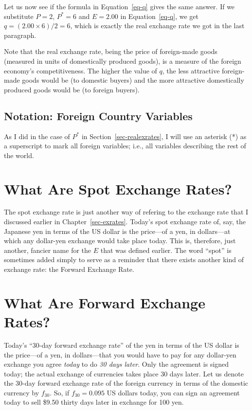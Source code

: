\documentclass[
  letterpaper,
]{book}
\theoremstyle{plain}
\theoremstyle{remark}
\begin{document}
Let us now see if the formula in Equation~\ref{eq-q} gives the same
answer. If we substitute \(P=2\), \(P^*=6\) and \(E=2.00\) in
Equation~\ref{eq-q}, we get \(q=(2.00\times 6)/2 =6\), which is exactly
the real exchange rate we got in the last paragraph.

Note that the real exchange rate, being the price of foreign-made goods
(measured in units of domestically produced goods), is a measure of the
foreign economy's
competitiveness.
The higher the value of \(q\), the less attractive foreign-made goods
would be (to domestic buyers) and the more attractive domestically
produced goods would be (to foreign buyers).

\subsection{Notation: Foreign Country Variables}\label{sec-notnfornvar}

As I did in the case of \(P^*\) in Section~\ref{sec-realexrates}, I will
use an asterisk (*) as a superscript to mark all foreign variables;
i.e., all variables describing the rest of the world.

\section{What Are Spot Exchange Rates?}\label{sec-spotexrates}

The spot exchange rate is just another way of refering to the exchange
rate that I discussed earlier in Chapter~\ref{sec-exrates}. Today's spot
exchange rate of, say, the
Japanese yen in terms of the US dollar is the price---of a yen, in
dollars---at which any dollar-yen exchange would take place today. This
is, therefore, just another, fancier name for the \(E\) that was defined
earlier. The word ``spot'' is sometimes added simply to serve as a
reminder that there exists another kind of exchange rate: the Forward
Exchange Rate.

\section{What Are Forward Exchange Rates?}\label{sec-forwardexrates}

Today's ``30-day forward exchange
rate'' of the yen in terms of
the US dollar is the price---of a yen, in dollars---that you would have
to pay for any dollar-yen exchange you agree \emph{today} to do \emph{30
days later}. Only the agreement is signed today; the actual exchange of
currencies takes place 30 days later. Let us denote the 30-day forward
exchange rate of the foreign currency in terms of the domestic currency
by \(f_{30}\). So, if \(f_{30} = 0.095\) US dollars today, you can sign
an agreement today to sell \$9.50 thirty days later in exchange for 100
yen.
\end{document}
